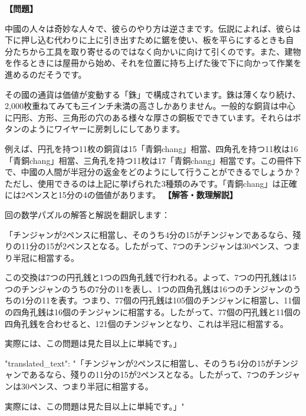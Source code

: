 \documentclass[10pt,a4paper,oneside,openany]{ltjsbook}
\begin{document}
\begin{tcolorbox}[colback=softblue,colframe=primaryblue,title=\textbf{第 25 問：CHINESE MONEY.},arc=2mm,boxrule=1pt,breakable]
\textbf{【問題】}\par\vspace{0.3em}
中國の人々は奇妙な人々で、彼らのやり方は逆さまです。伝説によれば、彼らは下に押し込む代わりに上に引き出すために鋸を使い、板を平らにするときも自分たちから工具を取り寄せるのではなく向かいに向けて引くのです。また、建物を作るときには屋冊から始め、それを位置に持ち上げた後で下に向かって作業を進めるのだそうです。

その國の通貨は価値が変動する「銖」で構成されています。銖は薄くなり続け、2,000枚重ねてみても三インチ未満の高さしかありません。一般的な銅貨は中心に円形、方形、三角形の穴のある様々な厚さの銅板でできています。それらはボタンのようにワイヤーに房刺しにしてあります。

例えば、円孔を持つ11枚の銅貨は15「青銅chang」相當、四角孔を持つ11枚は16「青銅chang」相當、三角孔を持つ11枚は17「青銅chang」相當です。この冊件下で、中國の人間が半冠分の返金をどのようにして行うことができるでしょうか？ただし、使用できるのは上記に挙げられた3種類のみです。「青銅chang」は正確には2ペンスと15分の4の価値があります。
\tcblower
\textbf{【解答・数理解説】}\par\vspace{0.3em}
回の数学パズルの解答と解説を翻訳します：

「チンジャンが2ペンスに相當し、そのうち4分の15がチンジャンであるなら、殘りの11分の15が2ペンスとなる。したがって、7つのチンジャンは30ペンス、つまり半冠に相當する。

この交換は7つの円孔銭と1つの四角孔銭で行われる。よって、7つの円孔銭は15つのチンジャンのうちの7分の11を表し、1つの四角孔銭は16つのチンジャンのうちの1分の11を表す。つまり、77個の円孔銭は105個のチンジャンに相當し、11個の四角孔銭は16個のチンジャンに相當する。したがって、77個の円孔銭と11個の四角孔銭を合わせると、121個のチンジャンとなり、これは半冠に相當する。

実際には、この問題は見た目以上に単純です。」

{
"translated\_text": "「チンジャンが2ペンスに相當し、そのうち4分の15がチンジャンであるなら、殘りの11分の15が2ペンスとなる。したがって、7つのチンジャンは30ペンス、つまり半冠に相當する。


実際には、この問題は見た目以上に単純です。」"
}
\end{tcolorbox}
\end{document}

